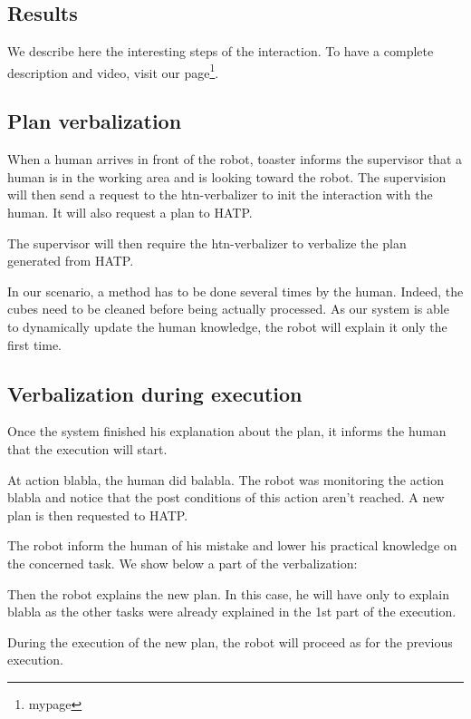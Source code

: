\documentclass{llncs}
\begin{document}
\subsection{Results}
\label{results}
We describe here the interesting steps of the interaction. To have a complete description and video, visit our page\footnote{mypage}.

\subsection{Plan verbalization}
When a human arrives in front of the robot, toaster informs the supervisor that a human is in the working area and is looking toward the robot.
The supervision will then send a request to the htn-verbalizer to init the interaction with the human. It will also request a plan to HATP.

The supervisor will then require the htn-verbalizer to verbalize the plan generated from HATP. %

In our scenario, a method has to be done several times by the human. Indeed, the cubes need to be cleaned before being actually processed.
As our system is able to dynamically update the human knowledge, the robot will explain it only the first time.

\subsection{Verbalization during execution}
Once the system finished his explanation about the plan, it informs the human that the execution will start.

At action blabla, the human did balabla. The robot was monitoring the action blabla and notice that the post conditions of this action aren't reached. A new plan is then requested to HATP.

The robot inform the human of his mistake and lower his practical knowledge on the concerned task.
We show below a part of the verbalization:

Then the robot explains the new plan. In this case, he will have only to explain blabla as the other tasks were already explained in the 1st part of the execution.

During the execution of the new plan, the robot will proceed as for the previous execution.

\end{document}
